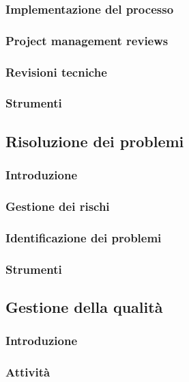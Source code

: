 \subsubsection{Implementazione del processo}
\subsubsection{Project management reviews}
\subsubsection{Revisioni tecniche}
\subsubsection{Strumenti}
\subsection{Risoluzione dei problemi}
\subsubsection{Introduzione}
\subsubsection{Gestione dei rischi}
\subsubsection{Identificazione dei problemi}
\subsubsection{Strumenti}
\subsection{Gestione della qualità}
\subsubsection{Introduzione}
\subsubsection{Attività}
